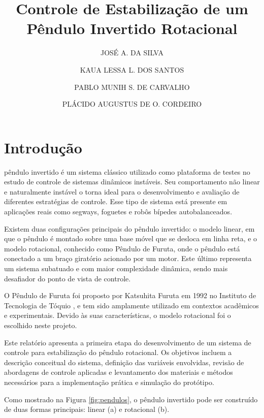\documentclass[9pt,a4paper,twocolumn,twoside]{tau-class/tau}
\title{Controle de Estabilização de um Pêndulo Invertido Rotacional}
\author[a,1]{JOSÉ A. DA SILVA}
\author[b,2]{KAUA LESSA L. DOS SANTOS }
\author[c,3]{PABLO MUNIH S. DE CARVALHO}
\author[d,4]{PLÁCIDO AUGUSTUS DE O. CORDEIRO}
\affil[a]{Engenharia da Computação, Universidade Federal de Alagoas}
\affil[b]{Engenharia da Computação, Universidade Federal de Alagoas}
\affil[c]{Engenharia da Computação, Universidade Federal de Alagoas}
\begin{document}
		
    \maketitle 
    \thispagestyle{firststyle} 
    \tauabstract 
    

\section{Introdução}

     pêndulo invertido é um sistema clássico utilizado como plataforma de testes no estudo de controle de sistemas dinâmicos instáveis. Seu comportamento não linear e naturalmente instável o torna ideal para o desenvolvimento e avaliação de diferentes estratégias de controle. Esse tipo de sistema está presente em aplicações reais como segways, foguetes e robôs bípedes autobalanceados.

    Existem duas configurações principais do pêndulo invertido: o modelo linear, em que o pêndulo é montado sobre uma base móvel que se desloca em linha reta, e o modelo rotacional, conhecido como Pêndulo de Furuta, onde o pêndulo está conectado a um braço giratório acionado por um motor. Este último representa um sistema subatuado e com maior complexidade dinâmica, sendo mais desafiador do ponto de vista de controle.

    O Pêndulo de Furuta foi proposto por Katsuhita Furuta em 1992 no Instituto de Tecnologia de Tóquio \cite{houck2013}, e tem sido amplamente utilizado em contextos acadêmicos e experimentais. Devido às suas características, o modelo rotacional foi o escolhido neste projeto.

    Este relatório apresenta a primeira etapa do desenvolvimento de um sistema de controle para estabilização do pêndulo rotacional. Os objetivos incluem a descrição conceitual do sistema, definição das variáveis envolvidas, revisão de abordagens de controle aplicadas e levantamento dos materiais e métodos necessários para a implementação prática e simulação do protótipo.


    
    Como mostrado na Figura \ref{fig:pendulos}, o pêndulo invertido pode ser construído de duas formas principais: linear (a) e rotacional (b).
    
\end{document}
